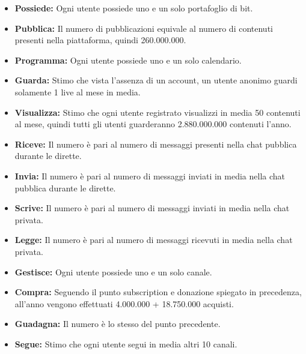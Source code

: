 \begin{itemize}
    \item \textbf{Possiede:} Ogni utente possiede uno e un solo portafoglio di bit.
    \item \textbf{Pubblica:} Il numero di pubblicazioni equivale al numero di contenuti presenti nella piattaforma, quindi 260.000.000.
    \item \textbf{Programma:} Ogni utente possiede uno e un solo calendario.
    \item \textbf{Guarda:} Stimo che vista l'assenza di un account, un utente anonimo guardi solamente 1 live al mese in media.
    \item \textbf{Visualizza:} Stimo che ogni utente registrato visualizzi in media 50 contenuti al mese, quindi tutti gli utenti guarderanno 2.880.000.000 contenuti l'anno.
    \item \textbf{Riceve:} Il numero è pari al numero di messaggi presenti nella chat pubblica durante le dirette.
    \item \textbf{Invia:} Il numero è pari al numero di messaggi inviati in media nella chat pubblica durante le dirette.
    \item \textbf{Scrive:} Il numero è pari al numero di messaggi inviati in media nella chat privata.
    \item \textbf{Legge:} Il numero è pari al numero di messaggi ricevuti in media nella chat privata.
    \item \textbf{Gestisce:} Ogni utente possiede uno e un solo canale.
    \item \textbf{Compra:} Seguendo il punto subscription e donazione spiegato in precedenza, all'anno vengono effettuati 4.000.000 + 18.750.000 acquisti.
    \item \textbf{Guadagna:} Il numero è lo stesso del punto precedente.
    \item \textbf{Segue:} Stimo che ogni utente segui in media altri 10 canali.
\end{itemize}







\newpage

